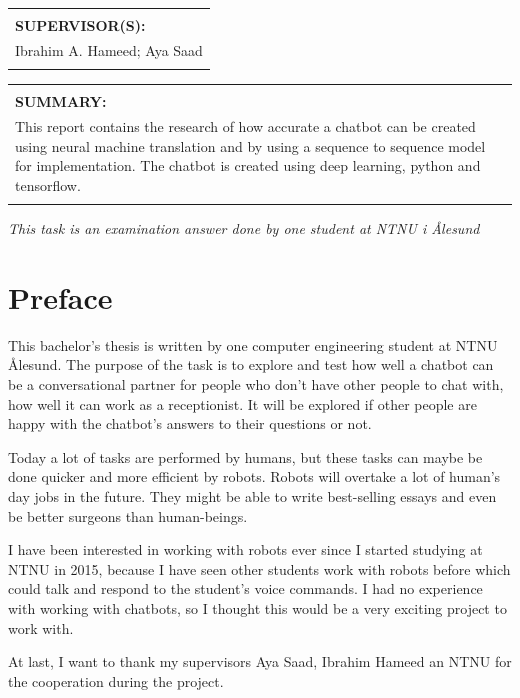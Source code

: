 \documentclass[english, a4paper]{report}
\newcommand{\summaryContent}{This report contains the research of how accurate a chatbot can be created using neural machine translation and by using a sequence to sequence model for implementation. The chatbot is created using deep learning, python and tensorflow.}
\begin{document}
\bigskip

\begin{tabularx}{\textwidth}{|X|}
    \hline
    \\
    \textbf{SUPERVISOR(S):}\\
    Ibrahim A. Hameed; Aya Saad\\
    \\
    \hline
\end{tabularx}

\bigskip

\noindent
\begin{table}[H]
    \setlength\tabcolsep{15pt} %
    \begin{tabularx}{\textwidth}{|X|}
        \hline
        \\
        \textbf{SUMMARY:}\\
        \summaryContent\\\\
        \hline
    \end{tabularx}
\end{table}

\bigskip
\centering
\textit{This task is an examination answer done by one student at NTNU i Ålesund}

\newpage
\raggedright
\pagestyle{fancy}
\fancyhf{}

\section{Preface}
    This bachelor's thesis is written by one computer engineering student at NTNU Ålesund. The purpose of the task is to explore and test how well a chatbot can be a conversational partner for people who don't have other people to chat with, how well it can work as a receptionist. It will be explored if other people are happy with the chatbot's answers to their questions or not.
    \par 
    Today a lot of tasks are performed by humans, but these tasks can maybe be done quicker and more efficient by robots. Robots will overtake a lot of human's day jobs in the future. They might be able to write best-selling essays and even be better surgeons than human-beings.
    \par 
    I have been interested in working with robots ever since I started studying at NTNU in 2015, because I have seen other students work with robots before which could talk and respond to the student's voice commands. I had no experience with working with chatbots, so I thought this would be a very exciting project to work with.
    \par 
    At last, I want to thank my supervisors Aya Saad, Ibrahim Hameed an NTNU for the cooperation during the project.
    
\end{document}
